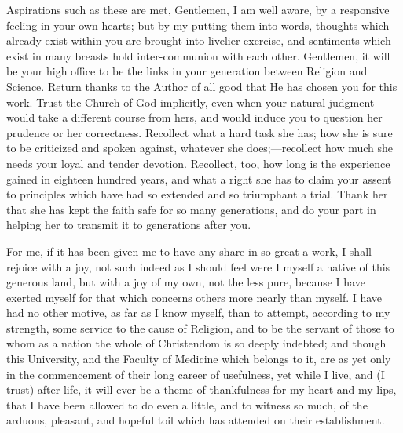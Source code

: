 Aspirations such as these are met, Gentlemen, I am well aware, by a
responsive feeling in your own hearts; but by my putting them into
words, thoughts which already exist within you are brought into
livelier exercise, and sentiments which exist in many breasts hold
inter-communion with each other. Gentlemen, it will be your high
office to be the links in your generation between Religion and
Science. Return thanks to the Author of all good that He has chosen
you for this work. Trust the Church of God implicitly, even when your
natural judgment would take a different course from hers, and would
induce you to question her prudence or her correctness. Recollect what
a hard task she has; how she is sure to be criticized and spoken
against, whatever she does;—recollect how much she needs your loyal
and tender devotion. Recollect, too, how long is the experience gained
in eighteen hundred years, and what a right she has to claim your
assent to principles which have had so extended and so
triumphant a trial. Thank her that she has kept the faith safe for so
many generations, and do your part in helping her to transmit it to
generations after you.

For me, if it has been given me to have any share in so great a
work, I shall rejoice with a joy, not such indeed as I should feel
were I myself a native of this generous land, but with a joy of my
own, not the less pure, because I have exerted myself for that which
concerns others more nearly than myself. I have had no other motive,
as far as I know myself, than to attempt, according to my strength,
some service to the cause of Religion, and to be the servant of those
to whom as a nation the whole of Christendom is so deeply indebted;
and though this University, and the Faculty of Medicine which belongs
to it, are as yet only in the commencement of their long career of
usefulness, yet while I live, and (I trust) after life, it will ever
be a theme of thankfulness for my heart and my lips, that I have been
allowed to do even a little, and to witness so much, of the arduous,
pleasant, and hopeful toil which has attended on their establishment.

